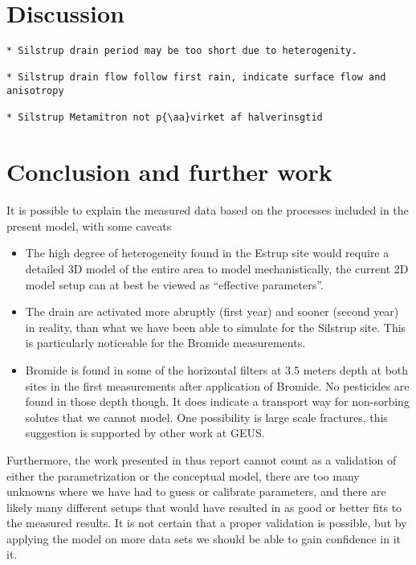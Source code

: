 \documentclass[a4paper]{article}
\begin{document}
\begin{text}
\section{Discussion}

\begin{verbatim}
* Silstrup drain period may be too short due to heterogenity.

* Silstrup drain flow follow first rain, indicate surface flow and anisotropy

* Silstrup Metamitron not p{\aa}virket af halverinsgtid
\end{verbatim}

\section{Conclusion and further work}

It is possible to explain the measured data based on the processes
included in the present model, with some caveats
\begin{itemize}
\item The high degree of heterogeneity found in the Estrup site would
  require a detailed 3D model of the entire area to model
  mechanistically, the current 2D model setup can at best be viewed as
  ``effective parameters''.
\item The drain are activated more abruptly (first year) and sooner
  (second year) in reality, than what we have been able to simulate
  for the Silstrup site.  This is particularly noticeable for the
  Bromide measurements.  
\item Bromide is found in some of the horizontal filters at 3.5 meters
  depth at both sites in the first measurements after application of
  Bromide.  No pesticides are found in those depth though.  It does
  indicate a transport way for non-sorbing solutes that we cannot
  model.  One possibility is large scale fractures, this suggestion is
  supported by other work at GEUS.
\end{itemize}

Furthermore, the work presented in thus report cannot count as a
validation of either the parametrization or the conceptual model,
there are too many unknowns where we have had to guess or calibrate
parameters, and there are likely many different setups that would have
resulted in as good or better fits to the measured results.  It is not
certain that a proper validation is possible, but by applying the
model on more data sets we should be able to gain confidence in it it.


\end{text}
\end{document}
